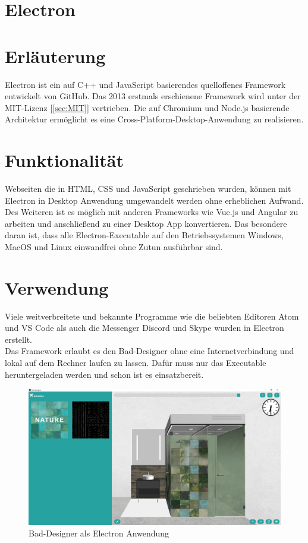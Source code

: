\newpage
\clearpage

\section{Electron}\label{sec:Electron}



\section*{Erläuterung}
Electron ist ein auf C++ und JavaScript basierendes quelloffenes Framework entwickelt von GitHub. Das 2013 erstmals erschienene Framework wird unter der MIT-Lizenz [\ref{sec:MIT}] vertrieben. Die auf Chromium und Node.js basierende Architektur ermöglicht es eine Cross-Platform-Desktop-Anwendung zu realisieren.

\section*{Funktionalität}
Webseiten die in HTML, CSS und JavaScript geschrieben wurden, können mit Electron in Desktop Anwendung umgewandelt werden ohne erheblichen Aufwand. Des Weiteren ist es möglich mit anderen Frameworks wie Vue.js und Angular zu arbeiten und anschließend zu einer Desktop App konvertieren. Das besondere daran ist, dass alle Electron-Executable auf den Betriebssystemen Windows, MacOS und Linux einwandfrei ohne Zutun ausführbar sind.


\section*{Verwendung}
Viele weitverbreitete und bekannte Programme wie die beliebten Editoren Atom und VS Code als auch die Messenger Discord und Skype wurden in Electron erstellt.
\\
Das Framework erlaubt es den Bad-Designer ohne eine Internetverbindung und lokal auf dem Rechner laufen zu lassen. Dafür muss nur das Executable heruntergeladen werden und schon ist es einsatzbereit.


\begin{figure}
	\begin{center}
		\includegraphics[width=16cm]{images/Electron_BD.png}
		\caption{Bad-Designer als Electron Anwendung}

	\end{center}
\end{figure}


